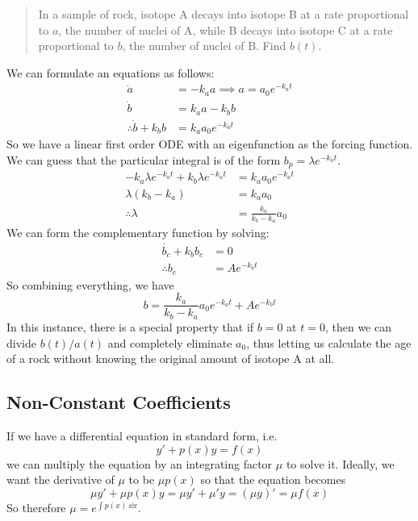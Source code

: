 \begin{quote}
	In a sample of rock, isotope A decays into isotope B at a rate proportional to \(a\), the number of nuclei of A, while B decays into isotope C at a rate proportional to \(b\), the number of nuclei of B. Find \(b(t)\).
\end{quote}

\noindent We can formulate an equations as follows:
\begin{align*}
	\dot a                    & = -k_a a \implies a = a_0 e^{-k_a t} \\
	\dot b                    & = k_a a - k_b b                      \\
	\therefore \dot b + k_b b & = k_a a_0 e^{-k_a t}
\end{align*}
\noindent So we have a linear first order ODE with an eigenfunction as the forcing function. We can guess that the particular integral is of the form \(b_p = \lambda e^{-k_a t}\).
\begin{align*}
	-k_a\lambda e^{-k_a t} + k_b \lambda e^{-k_a t} & = k_a a_0 e^{-k_a t}        \\
	\lambda(k_b-k_a)                                & = k_a a_0                   \\
	\therefore \lambda                              & = \frac{k_a}{k_b - k_a} a_0
\end{align*}
We can form the complementary function by solving:
\begin{align*}
	\dot{b_c} + k_b b_c & = 0           \\
	\therefore b_c      & = Ae^{-k_b t}
\end{align*}
So combining everything, we have
\[ b = \frac{k_a}{k_b - k_a} a_0 e^{-k_a t} + Ae^{-k_b t} \]
In this instance, there is a special property that if \(b=0\) at \(t=0\), then we can divide \(b(t)/a(t)\) and completely eliminate \(a_0\), thus letting us calculate the age of a rock without knowing the original amount of isotope A at all.

\subsection{Non-Constant Coefficients}
If we have a differential equation in standard form, i.e.
\[ y' + p(x)y = f(x) \]
we can multiply the equation by an integrating factor \(\mu\) to solve it. Ideally, we want the derivative of \(\mu\) to be \(\mu p(x)\) so that the equation becomes
\[ \mu y' + \mu p(x) y = \mu y' + \mu' y = (\mu y)' = \mu f(x) \]
So therefore \(\mu = e^{\int p(x)\ \dd{x}}\).
